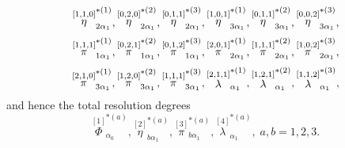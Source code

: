 \documentclass[a4paper,12pt]{article}
\begin{document}
\begin{equation}
\stackrel{\left[ 1,1,0\right] }{\eta }_{2\alpha _{1}}^{*(1)},\stackrel{%
\left[ 0,2,0\right] }{\eta }_{2\alpha _{1}}^{*(2)},\stackrel{\left[
0,1,1\right] }{\eta }_{2\alpha _{1}}^{*(3)},\stackrel{\left[ 1,0,1\right] }{%
\eta }_{3\alpha _{1}}^{*(1)},\stackrel{\left[ 0,1,1\right] }{\eta }_{3\alpha
_{1}}^{*(2)},\stackrel{\left[ 0,0,2\right] }{\eta }_{3\alpha _{1}}^{*(3)},
\label{sp3.27}
\end{equation}
\begin{equation}
\stackrel{\left[ 1,1,1\right] }{\pi }_{1\alpha _{1}}^{*(1)},\stackrel{\left[
0,2,1\right] }{\pi }_{1\alpha _{1}}^{*(2)},\stackrel{\left[ 0,1,2\right] }{%
\pi }_{1\alpha _{1}}^{*(3)},\stackrel{\left[ 2,0,1\right] }{\pi }_{2\alpha
_{1}}^{*(1)},\stackrel{\left[ 1,1,1\right] }{\pi }_{2\alpha _{1}}^{*(2)},%
\stackrel{\left[ 1,0,2\right] }{\pi }_{2\alpha _{1}}^{*(3)},  \label{sp3.28}
\end{equation}
\begin{equation}
\stackrel{\left[ 2,1,0\right] }{\pi }_{3\alpha _{1}}^{*(1)},\stackrel{\left[
1,2,0\right] }{\pi }_{3\alpha _{1}}^{*(2)},\stackrel{\left[ 1,1,1\right] }{%
\pi }_{3\alpha _{1}}^{*(3)},\stackrel{\left[ 2,1,1\right] }{\lambda }%
_{\alpha _{1}}^{*(1)},\stackrel{\left[ 1,2,1\right] }{\lambda }_{\alpha
_{1}}^{*(2)},\stackrel{\left[ 1,1,2\right] }{\lambda }_{\alpha _{1}}^{*(3)},
\label{sp3.29}
\end{equation}
and hence the total resolution degrees 
\begin{equation}
\stackrel{\left[ 1\right] }{\Phi }_{\alpha _{0}}^{*(a)},\stackrel{\left[
2\right] }{\eta }_{b\alpha _{1}}^{*(a)},\stackrel{\left[ 3\right] }{\pi }%
_{b\alpha _{1}}^{*(a)},\stackrel{\left[ 4\right] }{\lambda }_{\alpha
_{1}}^{*(a)},\;a,b=1,2,3.  \label{sp3.29a}
\end{equation}
\end{document}
